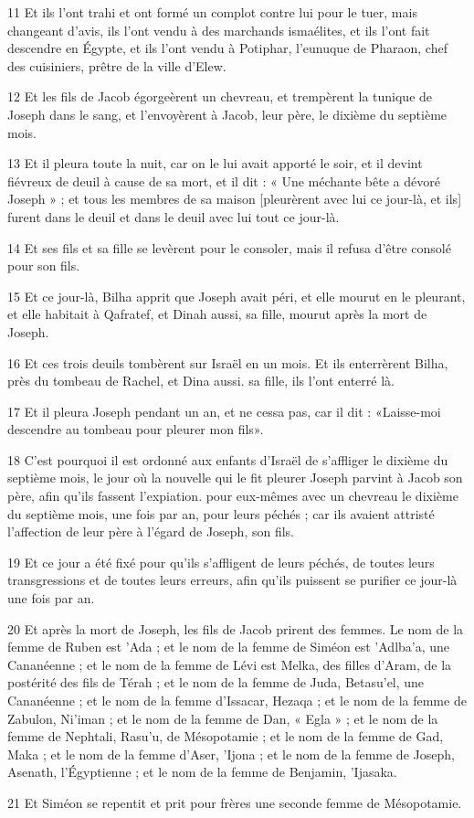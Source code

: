 \par 11 Et ils l'ont trahi et ont formé un complot contre lui pour le tuer, mais changeant d'avis, ils l'ont vendu à des marchands ismaélites, et ils l'ont fait descendre en Égypte, et ils l'ont vendu à Potiphar, l'eunuque de Pharaon, chef des cuisiniers, prêtre de la ville d'Elew.
\par 12 Et les fils de Jacob égorgeèrent un chevreau, et trempèrent la tunique de Joseph dans le sang, et l'envoyèrent à Jacob, leur père, le dixième du septième mois.
\par 13 Et il pleura toute la nuit, car on le lui avait apporté le soir, et il devint fiévreux de deuil à cause de sa mort, et il dit : « Une méchante bête a dévoré Joseph » ; et tous les membres de sa maison [pleurèrent avec lui ce jour-là, et ils] furent dans le deuil et dans le deuil avec lui tout ce jour-là.
\par 14 Et ses fils et sa fille se levèrent pour le consoler, mais il refusa d'être consolé pour son fils.
\par 15 Et ce jour-là, Bilha apprit que Joseph avait péri, et elle mourut en le pleurant, et elle habitait à Qafratef, et Dinah aussi, sa fille, mourut après la mort de Joseph.
\par 16 Et ces trois deuils tombèrent sur Israël en un mois. Et ils enterrèrent Bilha, près du tombeau de Rachel, et Dina aussi. sa fille, ils l'ont enterré là.
\par 17 Et il pleura Joseph pendant un an, et ne cessa pas, car il dit : «Laisse-moi descendre au tombeau pour pleurer mon fils».
\par 18 C'est pourquoi il est ordonné aux enfants d'Israël de s'affliger le dixième du septième mois, le jour où la nouvelle qui le fit pleurer Joseph parvint à Jacob son père, afin qu'ils fassent l'expiation. pour eux-mêmes avec un chevreau le dixième du septième mois, une fois par an, pour leurs péchés ; car ils avaient attristé l'affection de leur père à l'égard de Joseph, son fils.
\par 19 Et ce jour a été fixé pour qu'ils s'affligent de leurs péchés, de toutes leurs transgressions et de toutes leurs erreurs, afin qu'ils puissent se purifier ce jour-là une fois par an.
\par 20 Et après la mort de Joseph, les fils de Jacob prirent des femmes. Le nom de la femme de Ruben est 'Ada ; et le nom de la femme de Siméon est 'Adlba'a, une Cananéenne ; et le nom de la femme de Lévi est Melka, des filles d'Aram, de la postérité des fils de Térah ; et le nom de la femme de Juda, Betasu'el, une Cananéenne ; et le nom de la femme d'Issacar, Hezaqa ; et le nom de la femme de Zabulon, Ni'iman ; et le nom de la femme de Dan, « Egla » ; et le nom de la femme de Nephtali, Rasu'u, de Mésopotamie ; et le nom de la femme de Gad, Maka ; et le nom de la femme d'Aser, 'Ijona ; et le nom de la femme de Joseph, Asenath, l'Égyptienne ; et le nom de la femme de Benjamin, 'Ijasaka.
\par 21 Et Siméon se repentit et prit pour frères une seconde femme de Mésopotamie.

